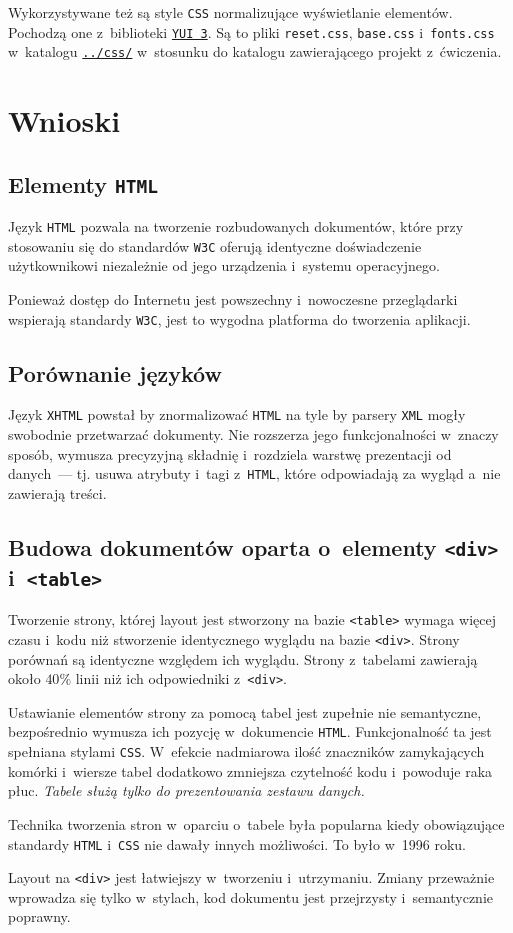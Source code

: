 \documentclass[10pt,a4paper]{article}
\newcommand{\f}[1]{\texttt{#1}}
\begin{document}
Wykorzystywane też są style \f{CSS} normalizujące wyświetlanie elementów.
Pochodzą one z~biblioteki \f{\href{http://yuilibrary.com/}{YUI 3}}. Są to pliki
\f{reset.css}, \f{base.css} i~\f{fonts.css} w~katalogu
\f{\href{https://github.com/student-tomasz/pi-laboratoria/tree/master/css}{../css/}}
w~stosunku do katalogu zawierającego projekt z~ćwiczenia.

\section{Wnioski}
\subsection{Elementy \f{HTML}}
Język \f{HTML} pozwala na tworzenie rozbudowanych dokumentów, które przy
stosowaniu się do standardów \f{W3C} oferują identyczne doświadczenie
użytkownikowi niezależnie od jego urządzenia i~systemu operacyjnego.

Ponieważ dostęp do Internetu jest powszechny i~nowoczesne przeglądarki wspierają
standardy \f{W3C}, jest to wygodna platforma do tworzenia aplikacji.

\subsection{Porównanie języków}
Język \f{XHTML} powstał by znormalizować \f{HTML} na tyle by parsery \f{XML}
mogły swobodnie przetwarzać dokumenty. Nie rozszerza jego funkcjonalności
w~znaczy sposób, wymusza precyzyjną składnię i~rozdziela warstwę prezentacji
od danych~--- tj. usuwa atrybuty i~tagi z~\f{HTML}, które odpowiadają za wygląd
a~nie zawierają treści.

\subsection{Budowa dokumentów oparta o~elementy \f{<div>} i~\f{<table>}}
Tworzenie strony, której layout jest stworzony na bazie \f{<table>} wymaga
więcej czasu i~kodu niż stworzenie identycznego wyglądu na bazie \f{<div>}.
Strony porównań są identyczne względem ich wyglądu. Strony z~tabelami zawierają
około $40\%$ linii niż ich odpowiedniki z~\f{<div>}.

Ustawianie elementów strony za pomocą tabel jest zupełnie nie semantyczne,
bezpośrednio wymusza ich pozycję w~dokumencie \f{HTML}. Funkcjonalność ta jest
spełniana stylami \f{CSS}. W~efekcie nadmiarowa ilość znaczników zamykających
komórki i~wiersze tabel dodatkowo zmniejsza czytelność kodu i~powoduje raka
płuc. \emph{Tabele służą tylko do prezentowania zestawu danych.}

Technika tworzenia stron w~oparciu o~tabele była popularna kiedy obowiązujące
standardy \f{HTML} i~\f{CSS} nie dawały innych możliwości. To było w~1996 roku.

Layout na \f{<div>} jest łatwiejszy w~tworzeniu i~utrzymaniu. Zmiany przeważnie
wprowadza się tylko w~stylach, kod dokumentu jest przejrzysty i~semantycznie
poprawny.
\end{document}
